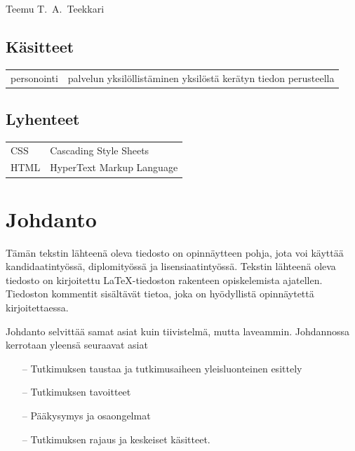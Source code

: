 \documentclass[finnish, 12pt, a4paper, elec, utf8, a-1b, online]{aaltothesis}
\begin{document}
\vspace{5mm}
{\hfill Teemu T.\ A.\ Teekkari \hspace{1cm}}

\newpage


\thesistableofcontents



\subsection*{Käsitteet}

\begin{tabular}{ll}
personointi & palvelun yksilöllistäminen yksilöstä kerätyn tiedon perusteella
\end{tabular}

\subsection*{Lyhenteet}

\begin{tabular}{ll}
CSS & Cascading Style Sheets \\
HTML & HyperText Markup Language
\end{tabular}


\cleardoublepage

\section{Johdanto}

Tämän tekstin lähteenä oleva tiedosto on opinnäytteen pohja, jota voi käyttää
kandidaatintyössä, diplomityössä ja lisensiaatintyössä. Tekstin lähteenä oleva
tiedosto on kirjoitettu \LaTeX-tiedoston rakenteen opiskelemista ajatellen.
Tiedoston kommentit sisältävät tietoa, joka on hyödyllistä opinnäytettä
kirjoitettaessa.

Johdanto selvittää samat asiat kuin tiivistelmä, mutta laveammin. Johdannossa
kerrotaan yleensä seuraavat asiat

\begin{itemize}
\item[--]Tutkimuksen taustaa ja tutkimusaiheen yleisluonteinen esittely
\item[--]Tutkimuksen tavoitteet
\item[--]Pääkysymys ja osaongelmat
\item[--]Tutkimuksen rajaus ja keskeiset käsitteet.
\end{itemize}
\end{document}
